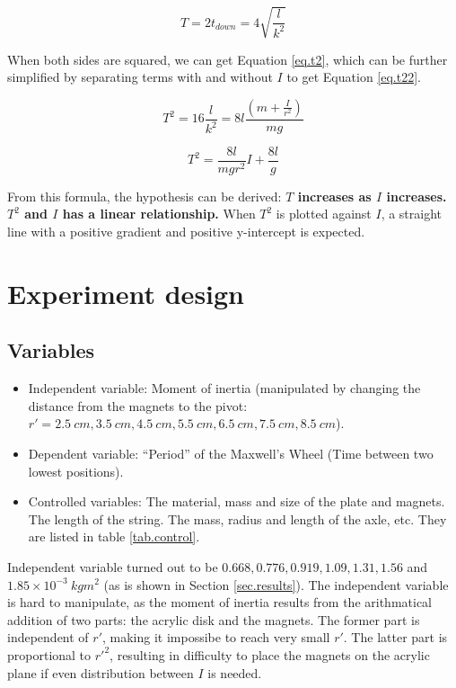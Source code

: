 \documentclass[a4paper]{article}
\begin{document}
\begin{equation}\label{eq.period}
    T = 2t_{down} = 4\sqrt{\dfrac{l}{k^2}}
\end{equation}

When both sides are squared, we can get Equation \ref{eq.t2}, which can be further simplified by separating terms with and without $I$ to get Equation \ref{eq.t22}.

\begin{equation}\label{eq.t2}
    T^2 = 16\dfrac{l}{k^2} = 8l\dfrac{(m+\frac{I}{r^2})}{mg}
\end{equation}

\begin{equation}\label{eq.t22}
    T^2 = \dfrac{8l}{mgr^2} I + \dfrac{8l}{g}
\end{equation}

From this formula, the hypothesis can be derived: \textbf{$T$ increases as $I$ increases. $T^2$ and $I$ has a linear relationship.} When $T^2$ is plotted against $I$, a straight line with a positive gradient and positive y-intercept is expected.

\section{Experiment design}

\subsection{Variables} 

\begin{itemize}
    \item Independent variable: Moment of inertia (manipulated by changing the distance from the magnets to the pivot: $r' = \SI{2.5}{cm}, \SI{3.5}{cm}, \SI{4.5}{cm}, \SI{5.5}{cm},\allowbreak \SI{6.5}{cm}, \SI{7.5}{cm}, \SI{8.5}{cm}$).
    \item Dependent variable: ``Period'' of the Maxwell's Wheel (Time between two lowest positions).
    \item Controlled variables: The material, mass and size of the plate and magnets. The length of the string. The mass, radius and length of the axle, etc. They are listed in table \ref{tab.control}.
\end{itemize}

Independent variable turned out to be $0.668, 0.776, 0.919, 1.09, 1.31, 1.56$ and $1.85 \times 10^{-3}\SI{}{kgm^2}$ (as is shown in Section \ref{sec.results}). The independent variable is hard to manipulate, as the moment of inertia results from the arithmatical addition of two parts: the acrylic disk and the magnets. The former part is independent of $r'$, making it impossibe to reach very small $r'$. The latter part is proportional to $r'^2$, resulting in difficulty to place the magnets on the acrylic plane if even distribution between $I$ is needed. 
\end{document}
